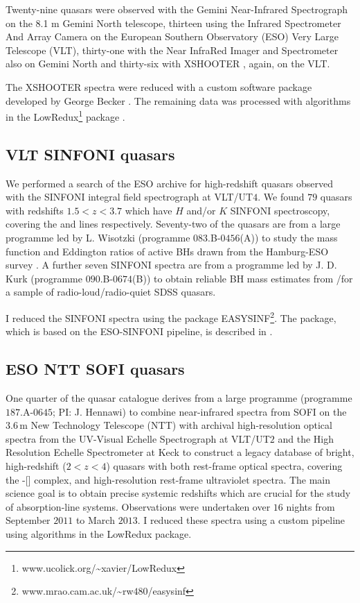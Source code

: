 Twenty-nine quasars were observed with the Gemini Near-Infrared Spectrograph \citep[GNIRS;][]{elias06} on the 8.1 m Gemini North telescope, thirteen using the Infrared Spectrometer And Array Camera \citep[ISAAC;][]{moorwood98b} on the European Southern Observatory (ESO) Very Large Telescope (VLT), thirty-one with the Near InfraRed Imager and Spectrometer \citep[NIRI;][]{hodapp03} also on Gemini North and thirty-six with XSHOOTER \citep{vernet11}, again, on the VLT. 

The  XSHOOTER  spectra  were  reduced  with  a  custom  software  package  developed  by  George  Becker \citep[for details, see][]{lau16}. 
The remaining data was processed with algorithms in the LowRedux\footnote{www.ucolick.org/\textasciitilde xavier/LowRedux} package \citep[see][]{prochaska09}.

\subsection{VLT SINFONI quasars}

We performed a search of the ESO archive for high-redshift quasars observed with the SINFONI  integral  field  spectrograph \citep{eisenhauer03,bonnet04} at VLT/UT$4$.
We found $79$ quasars with redshifts $1.5 < z < 3.7$ which have $H$ and/or $K$ SINFONI spectroscopy, covering the \hb and \ha lines respectively. 
Seventy-two of the quasars are from a large programme led by L. Wisotzki (programme $083$.B-$0456$(A)) to study the mass function and Eddington ratios of active BHs drawn from the Hamburg-ESO survey \citep{wisotzki00}.
A further seven SINFONI spectra are from a programme led by  J. D. Kurk (programme $090$.B-$0674$(B)) to obtain reliable BH mass estimates from \hans/\hb for a sample of radio-loud/radio-quiet SDSS quasars.

I reduced the SINFONI spectra using the package EASYSINF\footnote{www.mrao.cam.ac.uk/\textasciitilde rw$480$/easysinf}.  
The package, which is based on the ESO-SINFONI pipeline, is described in \citet{williams16}. 

\subsection{ESO NTT SOFI quasars}

One quarter of the quasar catalogue derives from a large programme (programme $187$.A-$0645$; PI: J. Hennawi) to combine near-infrared spectra from SOFI \citep{moorwood98a} on the $3.6$\,m New Technology Telescope (NTT) with archival high-resolution optical spectra from the UV-Visual Echelle Spectrograph \citep[UVES;][]{dekker00} at VLT/UT$2$ and the High Resolution Echelle Spectrometer \citep[HIRES;][]{vogt94} at Keck to construct a legacy database of bright, high-redshift ($2 < z < 4$) quasars with both rest-frame optical spectra, covering the \hbns-[] complex, and high-resolution rest-frame ultraviolet spectra.
The main science goal is to obtain precise systemic redshifts which are crucial for the study of absorption-line systems.  
Observations were undertaken over $16$ nights from September $2011$ to March $2013$.
I reduced these spectra using a custom pipeline using algorithms in the LowRedux package.

